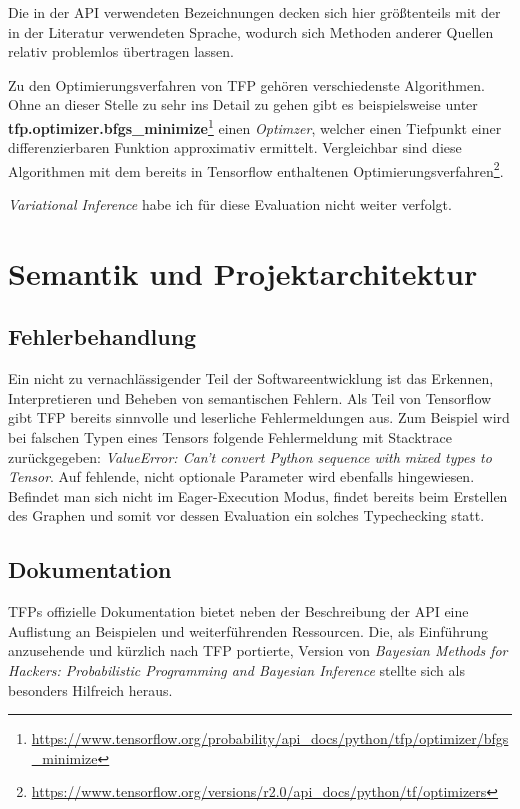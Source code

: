 \documentclass[12pt]{article}
\begin{document}
Die in der API verwendeten Bezeichnungen decken sich hier größtenteils mit der in der Literatur verwendeten Sprache, wodurch sich Methoden anderer Quellen relativ problemlos übertragen lassen. 

Zu den Optimierungsverfahren von TFP gehören verschiedenste Algorithmen. Ohne an dieser Stelle zu sehr ins Detail zu gehen gibt es beispielsweise unter \textbf{tfp.optimizer.bfgs\_minimize}\footnote{\url{https://www.tensorflow.org/probability/api_docs/python/tfp/optimizer/bfgs_minimize}} einen \textit{Optimzer}\cite{Nocedal2006}, welcher einen Tiefpunkt einer differenzierbaren Funktion approximativ ermittelt. Vergleichbar sind diese Algorithmen mit dem bereits in Tensorflow enthaltenen Optimierungsverfahren\footnote{\url{https://www.tensorflow.org/versions/r2.0/api_docs/python/tf/optimizers}}.

\textit{Variational Inference} habe ich für diese Evaluation nicht weiter verfolgt.

\section{Semantik und Projektarchitektur}

\subsection{Fehlerbehandlung}
Ein nicht zu vernachlässigender Teil der Softwareentwicklung ist das Erkennen, Interpretieren und Beheben von semantischen Fehlern. Als Teil von Tensorflow gibt TFP bereits sinnvolle und leserliche Fehlermeldungen aus. Zum Beispiel wird bei falschen Typen eines Tensors folgende Fehlermeldung mit Stacktrace zurückgegeben: \textit{ValueError: Can't convert Python sequence with mixed types to Tensor}. Auf fehlende, nicht optionale Parameter wird ebenfalls hingewiesen. Befindet man sich nicht im Eager-Execution Modus, findet bereits beim Erstellen des Graphen und somit vor dessen Evaluation ein solches Typechecking statt. 

\subsection{Dokumentation}
TFPs offizielle Dokumentation bietet neben der Beschreibung der API eine Auflistung an Beispielen und weiterführenden Ressourcen. Die, als Einführung anzusehende und kürzlich nach TFP portierte, Version von \textit{Bayesian Methods for Hackers: Probabilistic Programming and Bayesian Inference}\cite{Davidson-Pilon2015} stellte sich als besonders Hilfreich heraus.
\end{document}
